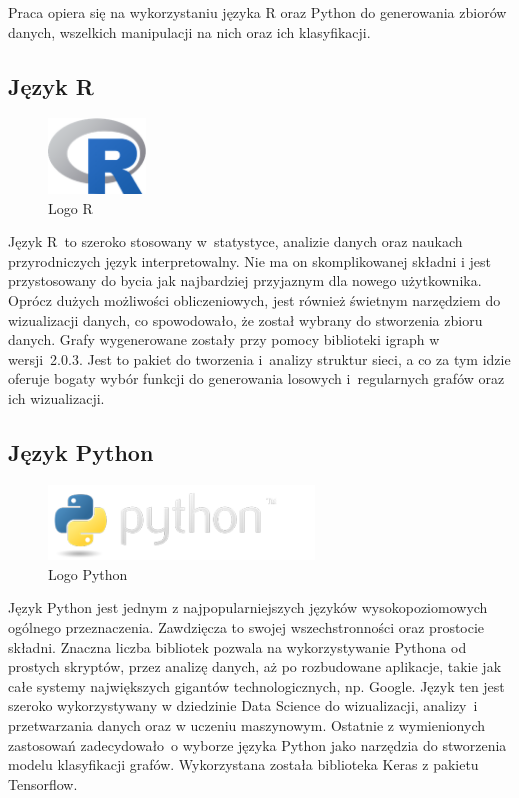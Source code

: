 Praca opiera się na wykorzystaniu języka R oraz Python do generowania zbiorów danych,
wszelkich manipulacji na nich oraz ich klasyfikacji.

\subsection{Język R}

\begin{figure}[ht]
	\centering
	\includegraphics[height=2cm]{resources/technologies/images/logo_r.png}
	\caption{Logo R \cite{strR}}
	\label{Fig:tech-r}
\end{figure}
\FloatBarrier

Język R~to szeroko stosowany w~statystyce, analizie danych oraz naukach przyrodniczych język interpretowalny.
Nie ma on skomplikowanej składni i jest przystosowany do bycia jak najbardziej przyjaznym dla nowego użytkownika.
Oprócz dużych możliwości obliczeniowych, jest również świetnym narzędziem do wizualizacji danych,
co spowodowało, że został wybrany do stworzenia zbioru danych.
Grafy wygenerowane zostały przy pomocy biblioteki igraph w wersji~2.0.3.
Jest to pakiet do tworzenia i~analizy struktur sieci, a co za tym idzie oferuje bogaty wybór funkcji do
generowania losowych i~regularnych grafów oraz ich wizualizacji.

\subsection{Język Python}

\begin{figure}[ht]
	\centering
	\includegraphics[height=2cm]{resources/technologies/images/logo_python.png}
	\caption{Logo Python \cite{strPython}}
	\label{Fig:tech-python}
\end{figure}
\FloatBarrier

Język Python jest jednym z najpopularniejszych języków wysokopoziomowych ogólnego przeznaczenia.
Zawdzięcza to swojej wszechstronności oraz prostocie składni.
Znaczna liczba bibliotek pozwala na wykorzystywanie Pythona od
prostych skryptów, przez analizę danych, aż po rozbudowane aplikacje, takie jak całe
systemy największych gigantów technologicznych, np. Google. Język ten jest szeroko
wykorzystywany w dziedzinie Data Science do wizualizacji, analizy~i przetwarzania danych oraz w uczeniu maszynowym.
Ostatnie z wymienionych zastosowań zadecydowało~o wyborze języka Python jako narzędzia do stworzenia modelu klasyfikacji grafów.
Wykorzystana została biblioteka Keras z pakietu Tensorflow.

